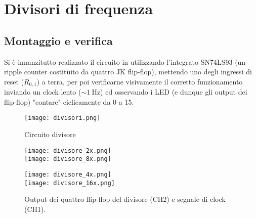 \section{Divisori di frequenza}
\subsection{Montaggio e verifica}
Si è innanzitutto realizzato il circuito in  utilizzando l'integrato SN74LS93 (un ripple counter costituito da quattro JK flip-flop), mettendo uno degli ingressi di reset ($R_{0,1}$) a terra, per poi verificarne visivamente il corretto funzionamento inviando un clock lento ($\sim \SI{1}{\Hz}$) ed osservando i LED (e dunque gli output dei flip-flop) "contare" ciclicamente da 0 a 15.

\begin{figure}[h]
	\centering
	\texttt{[image: divisori.png]}
	\caption{Circuito divisore}
	\label{fig:div}
\end{figure}

\begin{figure}[h]
	\centering
	\begin{minipage}{0.47\textwidth}
		\texttt{[image: divisore\_2x.png]}
		\\
		\texttt{[image: divisore\_8x.png]}
	\end{minipage}
	\begin{minipage}{0.47\textwidth}
		\texttt{[image: divisore\_4x.png]}
		\\
		\texttt{[image: divisore\_16x.png]}
	\end{minipage}
	\caption{Output dei quattro flip-flop del divisore (CH2) e segnale di clock (CH1).}
	\label{fig:divout}
\end{figure}
